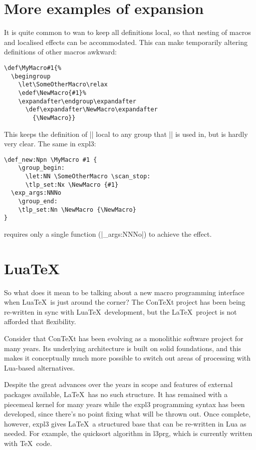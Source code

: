 \documentclass{ltugboat}
\def\pkg#1{\textsf{#1}}
\begin{document}
\section{More examples of expansion}

It is quite common to wan to keep all definitions local, so that
nesting of macros and localised effects can be accommodated.  This can
make temporarily altering definitions of other macros awkward:
\begin{lstlisting}
\def\MyMacro#1{%
  \begingroup
    \let\SomeOtherMacro\relax
    \edef\NewMacro{#1}%
    \expandafter\endgroup\expandafter
      \def\expandafter\NewMacro\expandafter
        {\NewMacro}}
\end{lstlisting}
This keeps the definition of |\NewMacro| local to any group that |\MyMacro|
is used in, but is hardly very clear.  The same in \pkg{expl3}:
\begin{lstlisting}
\def_new:Npn \MyMacro #1 {
    \group_begin:
      \let:NN \SomeOtherMacro \scan_stop:
      \tlp_set:Nx \NewMacro {#1}
  \exp_args:NNNo 
    \group_end: 
    \tlp_set:Nn \NewMacro {\NewMacro}
}
\end{lstlisting}
requires only a single function (|\exp_args:NNNo|) to achieve the effect.

\section{Lua\TeX}

So what does it mean to be talking about a new macro programming interface
when Lua\TeX\ is just around the corner? The Con\TeX{}t project has been being
re-written in sync with Lua\TeX\ development, but the \LaTeX\ project is not
afforded that flexibility.

Consider that Con\TeX{}t has been evolving as a monolithic software project
for many years. Its underlying architecture is built on solid foundations, and
this makes it conceptually much more possible to switch out areas of
processing with Lua-based alternatives.

Despite the great advances over the years in scope and features of external
packages available, \LaTeX\ has no such structure. It has remained with a
piecemeal kernel for many years while the \pkg{expl3} programming syntax has
been developed, since there's no point fixing what will be thrown out. Once
complete, however, \pkg{expl3} gives \LaTeX\ a structured base that can be
re-written in Lua as needed. For example, the quicksort algorithm in
\pkg{l3prg}, which is currently written with \TeX\ code.
\end{document}
